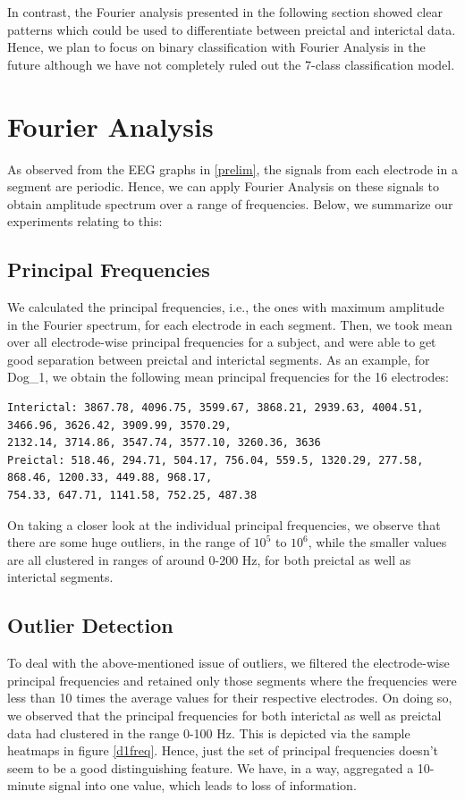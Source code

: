 \documentclass[a4paper]{article}
\begin{document}
In contrast, the Fourier analysis presented in the following section showed clear patterns which could be used to differentiate between preictal and interictal data. Hence, we plan to focus on binary classification with Fourier Analysis in the future although we have not completely ruled out the 7-class classification model.

\section{Fourier Analysis}
As observed from the EEG graphs in \ref{prelim}, the signals from each electrode in a segment are periodic. Hence, we can apply Fourier Analysis on these signals to obtain amplitude spectrum over a range of frequencies. Below, we summarize our experiments relating to this: 

\subsection{Principal Frequencies}
We calculated the principal frequencies, i.e., the ones with maximum amplitude in the Fourier spectrum, for each electrode in each segment. Then, we took mean over all electrode-wise principal frequencies for a subject, and were able to get good separation between preictal and interictal segments. As an example, for Dog\_1, we obtain the following mean principal frequencies for the 16 electrodes:
\begin{verbatim}
Interictal: 3867.78, 4096.75, 3599.67, 3868.21, 2939.63, 4004.51,  3466.96, 3626.42, 3909.99, 3570.29,
2132.14, 3714.86, 3547.74, 3577.10, 3260.36, 3636
Preictal: 518.46, 294.71, 504.17, 756.04, 559.5, 1320.29, 277.58,  868.46, 1200.33, 449.88, 968.17, 
754.33, 647.71, 1141.58, 752.25, 487.38
\end{verbatim} 
On taking a closer look at the individual principal frequencies, we observe that there are some huge outliers, in the range of $10^{5}$ to $10^{6}$, while the smaller values are all clustered in ranges of around 0-200 Hz, for both preictal as well as interictal segments. 

\subsection{Outlier Detection}
To deal with the above-mentioned issue of outliers, we filtered the electrode-wise principal frequencies and retained only those segments where the frequencies were less than 10 times the average values for their respective electrodes. On doing so, we observed that the principal frequencies for both interictal as well as preictal data had clustered in the range 0-100 Hz. This is depicted via the sample heatmaps in figure \ref{d1freq}. Hence, just the set of principal frequencies doesn't seem to be a good distinguishing feature. We have, in a way, aggregated a 10-minute signal into one value, which leads to loss of information.
\end{document}
